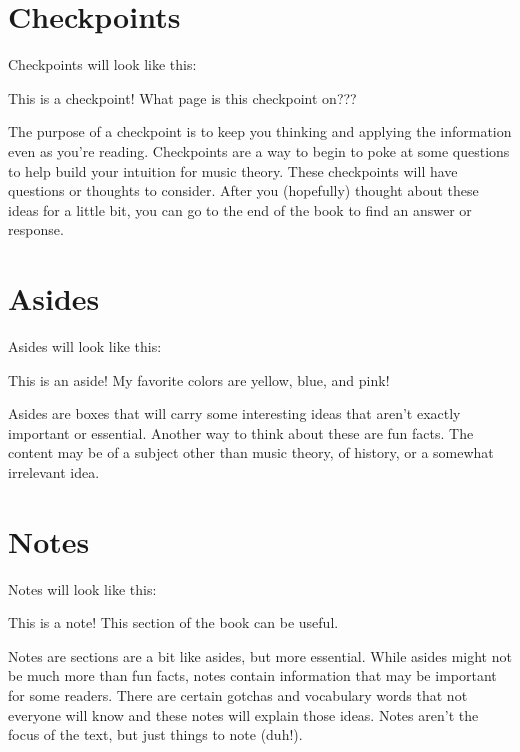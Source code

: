 \documentclass[../OpenAppliedMusicTheory.tex]{subfiles}
\begin{document}
    \section{Checkpoints}\label{ch0:checkpoints}
    Checkpoints will look like this:
    \begin{checkpoint}
        This is a checkpoint! What page is this checkpoint on???
    \end{checkpoint}
    The purpose of a checkpoint is to keep you thinking and applying the information even as you're reading. Checkpoints are a way to begin to poke at some questions to help build your intuition for music theory. These checkpoints will have questions or thoughts to consider. After you (hopefully) thought about these ideas for a little bit, you can go to the end of the book to find an answer or response.

    \section{Asides}\label{ch0:asides}
    Asides will look like this:
    \begin{aside}{This is an aside!}
        My favorite colors are yellow, blue, and pink!
    \end{aside}
    Asides are boxes that will carry some interesting ideas that aren't exactly important or essential. Another way to think about these are fun facts. The content may be of a subject other than music theory, of history, or a somewhat irrelevant idea.

    \section{Notes}\label{ch0:notes}
    Notes will look like this:
    \begin{note}{This is a note!}
        This section of the book can be useful.
    \end{note}
    Notes are sections are a bit like asides, but more essential. While asides might not be much more than fun facts, notes contain information that may be important for some readers. There are certain gotchas and vocabulary words that not everyone will know and these notes will explain those ideas. Notes aren't the focus of the text, but just things to note (duh!).
\end{document}
